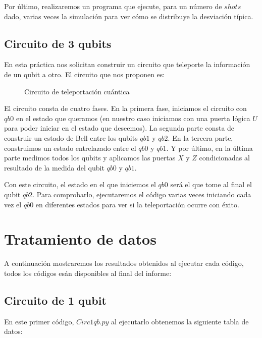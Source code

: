 \documentclass[11pt, a4paper, twocolumn]{article}
\begin{document}
Por último, realizaremos un programa que ejecute, para un número de $shots$ dado,
varias veces la simulación para ver cómo se distribuye la desviación típica. 

\subsection{Circuito de 3 qubits}
En esta práctica nos solicitan construir un circuito que teleporte la información
de un qubit a otro. El circuito que nos proponen es:

\begin{figure}[h]
	\centering
	
	\caption{Circuito de teleportación cuántica}
	\label{circ3qb}
\end{figure}

El circuito consta de cuatro fases. En la primera fase, iniciamos el circuito 
con $qb0$ en el estado que queramos (en nuestro caso iniciamos con una puerta lógica $U$ para poder iniciar en el estado que deseemos).
La segunda parte consta de construir un estado de Bell entre los qubits $qb1$ y $qb2$.
En la tercera parte, construimos un estado entrelazado entre el $qb0$ y $qb1$. Y 
por último, en la última parte medimos todos los qubits y aplicamos las puertas $X$ y 
$Z$ condicionadas al resultado de la medida del qubit $qb0$ y $qb1$.

\vspace{0.2cm}

Con este circuito, el estado en el que iniciemos el $qb0$ será el que tome al final 
el qubit $qb2$. Para comprobarlo, ejecutaremos el código varias veces iniciando
cada vez el $qb0$ en diferentes estados para ver si la teleportación ocurre 
con éxito.

\section{Tratamiento de datos}

A continuación mostraremos los resultados obtenidos al ejecutar cada código, todos
los códigos esán disponibles al final del informe:

\subsection{Circuito de 1 qubit}

En este primer código, $Circ1qb.py$ al ejecutarlo obtenemos la siguiente tabla de datos:
\end{document}
